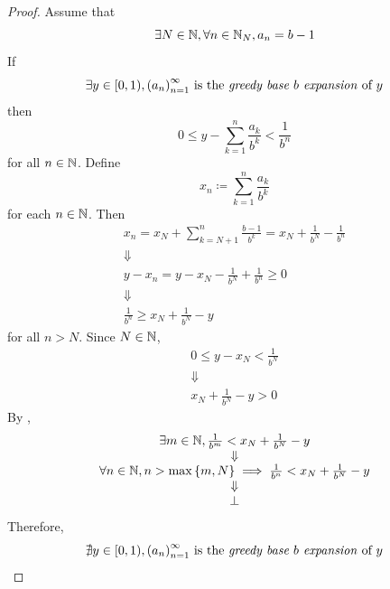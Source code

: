 \begin{proof}
    Assume that
    \[
    \exists N \in \N, \forall n \in \N_{N}, a_{n} = b - 1
    \]
    If
    \[
    \exists y \in [0, 1), \paren*{a_{n}}_{n = 1}^{\infty} \text{ is the \emph{greedy base $b$ expansion} of $y$}
    \]
    then
    \[
    0 \leq y - \sum_{k = 1}^{n} \frac{a_{k}}{b^{k}} < \frac{1}{b^{n}}
    \]
    for all $n \in \N$. Define
    \[
    x_{n} \coloneqq \sum_{k = 1}^{n} \frac{a_{k}}{b^{k}}
    \]
    for each $n \in \N$. Then
    \[
    \begin{array}{c}
        x_{n} = x_{N} + \sum_{k = N + 1}^{n} \frac{b - 1}{b^{k}} = x_{N} + \frac{1}{b^{N}} - \frac{1}{b^{n}} \\
        \Downarrow \\
        y - x_{n} = y - x_{N} - \frac{1}{b^{N}} + \frac{1}{b^{n}} \geq 0 \\
        \Downarrow \\
        \frac{1}{b^{n}} \geq x_{N} + \frac{1}{b^{N}} - y
    \end{array}
    \]
    for all $n > N$. Since $N \in \N$,
    \[
    \begin{array}{c}
        0 \leq y - x_{N} < \frac{1}{b^{N}} \\
        \Downarrow \\
        x_{N} + \frac{1}{b^{N}} - y > 0
    \end{array}
    \]
    By ,
    \[
    \begin{array}{c}
        \exists m \in \N, \frac{1}{b^{m}} < x_{N} + \frac{1}{b^{N}} - y \\
        \Downarrow \\
        \forall n \in \N, n > \max{\set*{m, N}} \implies \frac{1}{b^{n}} < x_{N} + \frac{1}{b^{N}} - y \\
        \Downarrow \\
        \bot
    \end{array}
    \]
    Therefore,
    \[
    \nexists y \in [0, 1), \paren*{a_{n}}_{n = 1}^{\infty} \text{ is the \emph{greedy base $b$ expansion} of $y$}
    \]
\end{proof}
